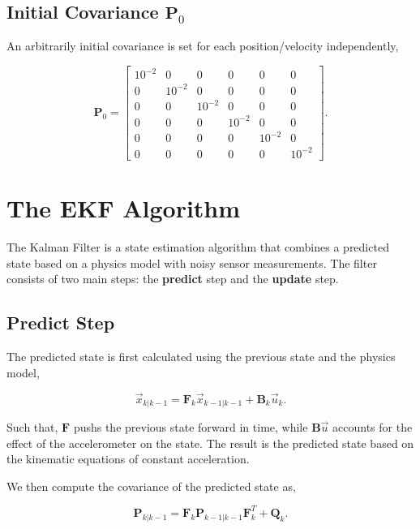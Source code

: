 \documentclass{article}
\begin{document}
\subsection{Initial Covariance $\mathbf{P}_0$}

An arbitrarily initial covariance is set for each position/velocity independently, 

\begin{equation}
\mathbf{P}_0 =
\begin{bmatrix}
10^{-2} & 0 & 0 & 0 & 0 & 0 \\
0 & 10^{-2} & 0 & 0 & 0 & 0 \\
0 & 0 & 10^{-2} & 0 & 0 & 0 \\
0 & 0 & 0 & 10^{-2} & 0 & 0 \\
0 & 0 & 0 & 0 & 10^{-2} & 0 \\
0 & 0 & 0 & 0 & 0 & 10^{-2} 
\end{bmatrix}.   
\end{equation}



\section{The EKF Algorithm}
\label{sec:algo}

The Kalman Filter is a state estimation algorithm that combines a predicted state based on a physics model with noisy sensor measurements. The filter consists of two main steps: the \textbf{predict} step and the \textbf{update} step.

\subsection{Predict Step}
The predicted state is first calculated using the previous state and the physics model, 

\begin{equation}
    \vec{x}_{k|k-1} =
    \mathbf{F}_k \vec{x}_{k-1|k-1}
    + \mathbf{B}_k \vec{u}_k .
    \label{eq:state_prediction}
\end{equation}

Such that, $\mathbf{F}$ pushs the previous state forward in time, while $\mathbf{B}\vec{u}$ accounts for the effect of the accelerometer on the state. The result is the predicted state based on the kinematic equations of constant acceleration. 

We then compute the covariance of the predicted state as, 

\begin{equation}
    \mathbf{P}_{k|k-1} =
    \mathbf{F}_k \mathbf{P}_{k-1|k-1} \mathbf{F}_k^T
    + \mathbf{Q}_k .
    \label{eq:covariance_prediction}
\end{equation}
\end{document}
